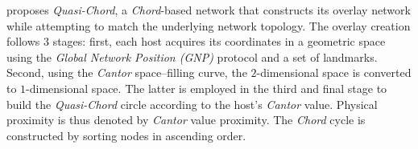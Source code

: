\cite{SZ2008} proposes \emph{Quasi-Chord}, a \emph{Chord}-based network that
constructs its overlay network while attempting to match the underlying 
network topology.
The overlay creation follows $3$ stages:
first, each host acquires its coordinates in
a geometric space using the \emph{Global Network Position (GNP)} protocol
\cite{ng_gnp_2001} and a set of landmarks.
Second, using the \emph{Cantor} space--filling curve, 
the $2$-dimensional space is converted to $1$-dimensional space. 
The latter is employed in the third and final stage to build 
the \emph{Quasi-Chord} circle according to the host's \emph{Cantor} value. 
Physical proximity is thus denoted by \emph{Cantor} value proximity. 
The \emph{Chord} cycle is constructed by sorting nodes in 
ascending order.
%
%
%
